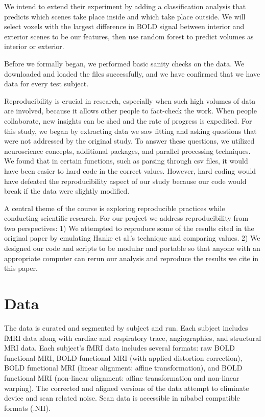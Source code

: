 \documentclass[11pt]{article}
\begin{document}
We intend to extend their experiment by adding a classification analysis that
predicts which scenes take place inside and which take place outside.  We will
select voxels with the largest difference in BOLD signal
between interior and exterior scenes to be our features, then use random forest to 
predict volumes as interior or exterior.

Before we formally began, we performed basic sanity checks on the data. We
downloaded and loaded the files successfully, and we have confirmed that we
have data for every test subject. 

Reproducibility is crucial in research, especially when such high volumes of
data are involved, because it allows other people to fact-check the work. When
people collaborate, new insights can be shed and the rate of progress is
expedited. For this study, we began by extracting data we saw fitting and
asking questions that were not addressed by the original study. To answer
these questions, we utilized neuroscience concepts, additional packages, and
parallel processing techniques. We found that in certain functions, such as
parsing through csv files, it would have been easier to hard code in the
correct values. However, hard coding would have defeated the reproducibility
aspect of our study because our code would break if the data were slightly
modified.

A central theme of the course is exploring reproducible practices while 
conducting scientific research. For our project we address reproducibility from 
two perspectives: 1) We attempted to 
reproduce some of the results cited in the original paper by emulating Hanke 
et al.'s technique and comparing values. 2) We designed our code and scripts to be modular and 
portable so that anyone with an appropriate computer can rerun our analysis 
and reproduce the results we cite in this paper. 

\section{Data}

The data is curated and segmented by subject and run. Each subject includes fMRI data along with cardiac and
respiratory trace, angiographies, and structural MRI data. Each subject's fMRI
data includes several formats: raw BOLD functional MRI, BOLD functional
MRI (with applied distortion correction), BOLD functional MRI (linear
alignment: affine transformation), and BOLD functional MRI (non-linear
alignment: affine transformation and non-linear warping). The corrected and aligned versions of the data attempt to
eliminate device and scan related noise. Scan data is accessible in nibabel
compatible formats (.NII).
\end{document}
